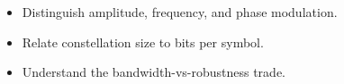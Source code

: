\begin{objectives}
\begin{itemize}[leftmargin=1.4em,itemsep=2pt]
\item Distinguish amplitude, frequency, and phase modulation.
\item Relate constellation size to bits per symbol.
\item Understand the bandwidth-vs-robustness trade.
\end{itemize}
\end{objectives}
